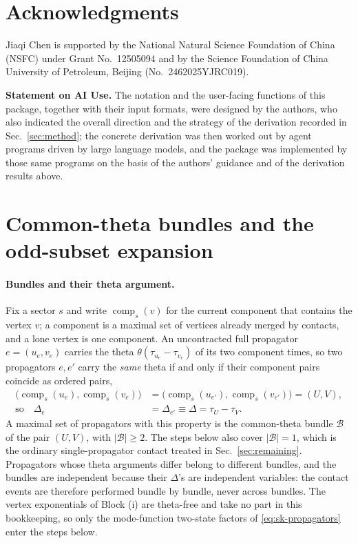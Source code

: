 \documentclass[11pt,a4paper]{article}
\newcommand{\cB}{\mathcal B}
\begin{document}
\section*{Acknowledgments}

Jiaqi Chen is supported by the National Natural Science Foundation of China (NSFC) under
Grant No.~12505094 and by the Science Foundation of China University of Petroleum, Beijing
(No.~2462025YJRC019).

\medskip
\noindent\textbf{Statement on AI Use.}
The notation and the user-facing functions of this package, together with their input formats, were
designed by the
authors, who also indicated the overall direction and the strategy of the derivation recorded in
Sec.~\ref{sec:method}; the concrete derivation was then worked out by agent programs driven by
large language models, and the package was implemented by those same programs on the basis of the
authors' guidance and of the derivation results above.

\appendix

\section{Common-theta bundles and the odd-subset expansion}
\label{app:theta}

\paragraph{Bundles and their theta argument.}
Fix a sector $s$ and write $\operatorname{comp}_s(v)$ for the current component that contains the
vertex $v$; a component is a maximal set of vertices already merged by contacts, and a lone vertex
is one component. An uncontracted full propagator $e=(u_e,v_e)$ carries the theta
$\theta(\tau_{u_e}-\tau_{v_e})$ of its two component times, so two propagators $e,e'$ carry the
\emph{same} theta if and only if their component pairs coincide as ordered pairs,
\begin{equation}
  \begin{aligned}
  \bigl(\operatorname{comp}_s(u_e),\operatorname{comp}_s(v_e)\bigr)
  &=\bigl(\operatorname{comp}_s(u_{e'}),\operatorname{comp}_s(v_{e'})\bigr)=(U,V),\\
  \text{so}\quad \Delta_e&=\Delta_{e'}\equiv\Delta=\tau_U-\tau_V .
  \end{aligned}
  \label{eq:bundle-criterion}
\end{equation}
A maximal set of propagators with this property is the common-theta bundle $\cB$ of the pair $(U,V)$, with
$|\cB|\ge2$. The steps below also cover $|\cB|=1$, which is the ordinary single-propagator contact
treated in Sec.~\ref{sec:remaining}. Propagators whose theta arguments differ belong to different bundles, and the
bundles are independent because their $\Delta$'s are independent variables: the contact events are
therefore performed bundle by bundle, never across bundles. The vertex exponentials of Block (i) are
theta-free and take no part in this bookkeeping, so only the mode-function two-state factors of \eqref{eq:sk-propagators} enter the steps below.
\end{document}
